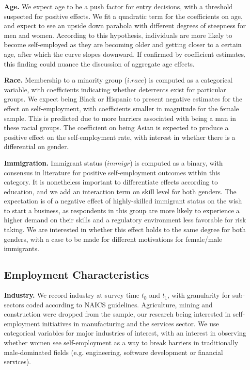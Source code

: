 \textbf{Age.} We expect age to be a push factor for entry decisions, with a threshold suspected for positive effects. We fit a quadratic term for the coefficients on age, and expect to see an upside down parabola with different degrees of steepness for men and women. According to this hypothesis, individuals are more likely to become self-employed as they are becoming older and getting closer to a certain age, after which the curve slopes downward. If confirmed by coefficient estimates, this finding could nuance the discussion of aggregate age effects. 

\textbf{Race.} Membership to a minority group ($i.race$) is computed as a categorical variable, with coefficients indicating whether deterrents exist for particular groups. We expect being Black or Hispanic to present negative estimates for the effect on self-employment, with coefficients smaller in magnitude for the female sample. This is predicted due to more barriers associated with being a man in these racial groups. The coefficient on being Asian is expected to produce a positive effect on the self-employment rate, with interest in whether there is a differential on gender. 


\textbf{Immigration.} Immigrant status ($immigr$) is computed as a binary, with consensus in literature for positive self-employment outcomes within this category. It is nonetheless important to differentiate effects according to education, and we add an interaction term on skill level for both genders. The expectation is of a negative effect of highly-skilled immigrant status on the wish to start a business, as respondents in this group are more likely to experience a higher demand on their skills and a regulatory environment less favorable for risk taking. We are interested in whether this effect holds to the same degree for both genders, with a case to be made for different motivations for female/male immigrants. 


\subsection{Employment Characteristics}

\textbf{Industry.} We record industry at survey time $t_0$ and $t_1$, with granularity for sub-sectors coded according to NAICS guidelines. Agriculture, mining and construction were dropped from the sample, our research being interested in self-employment initiatives in manufacturing and the services sector. We use categorical variables for major industries of interest, with an interest in observing whether women see self-employment as a way to break barriers in traditionally male-dominated fields (e.g. engineering, software development or financial services).

